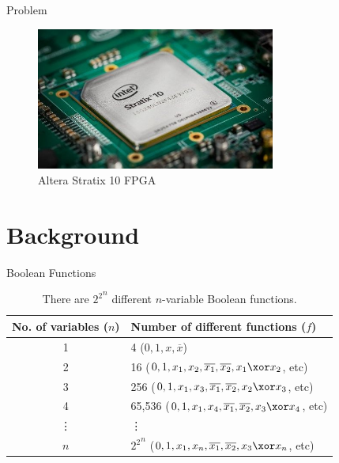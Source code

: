 \documentclass[10pt, compress]{beamer}
\begin{document}
\begin{frame}{Problem}
    \begin{figure}
        \centering
        \includegraphics[width=0.7\textwidth]{figures/fpga.jpeg}
        \caption{Altera Stratix 10 FPGA}
    \end{figure}
\end{frame}

\section{Background}

\begin{frame}{Boolean Functions}
    \begin{table}[H]
        \centering
        \caption{There are ${2^2}^n$ different $n$-variable Boolean functions.}
        \def\arraystretch{1.5}
        \begin{tabular}{|c|l|}
        \hline
        No. of variables ($n$)  & Number of different functions ($f$)                                               \\ \hline
        1                       & 4 ($0, 1, x, \overline{x}$)	                                                    \\ \hline
        2                       & 16 ($0, 1, x_1, x_2, \overline{x_1}, \overline{x_2}, x_1 \xor x_2$, etc)          \\ \hline
        3                       & 256 ($0, 1, x_1, x_3, \overline{x_1}, \overline{x_2}, x_2 \xor x_3$, etc)         \\ \hline
        4                       & 65,536 ($0, 1, x_1, x_4, \overline{x_1}, \overline{x_2}, x_3 \xor x_4$, etc)      \\ \hline
        \vdots                  & \vdots                                                                            \\ \hline
        $n$                     & ${2^2}^n$ ($0, 1, x_1, x_n, \overline{x_1}, \overline{x_2}, x_3 \xor x_n$, etc)   \\ \hline
        \end{tabular}
    \end{table}
\end{frame}
\end{document}
